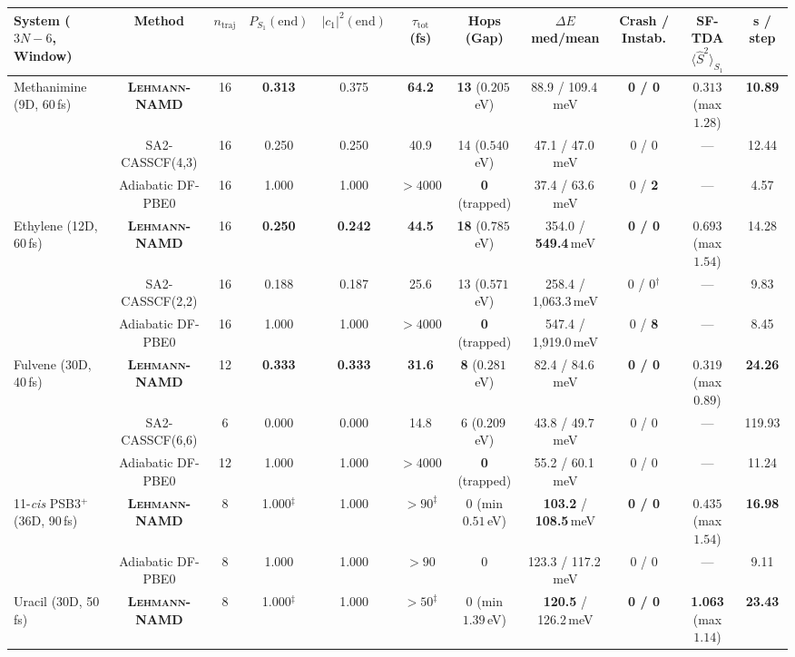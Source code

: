 \documentclass[10pt,twocolumn]{article}
\theoremstyle{natthm}
\newcommand{\leh}{\textsc{Lehmann-NAMD}}
\newcommand{\Ssq}{\langle\hat{S}^2\rangle}
\begin{document}
\begin{table}[t!]
{\begin{tabular}{@{}lcccccccccc@{}}
\midrule
\textbf{System ($3N{-}6$, Window)} & \textbf{Method} & \textbf{$n_{\mathrm{traj}}$} & \textbf{$P_{S_1}(\mathrm{end})$} & \textbf{$|c_1|^2(\mathrm{end})$} & \textbf{$\tau_{\mathrm{tot}}$ (fs)} & \textbf{Hops (Gap)} & \textbf{$\Delta E$ med/mean} & \textbf{Crash / Instab.} & \textbf{SF-TDA $\Ssq_{S_1}$} & \textbf{s / step} \\
\midrule
\multirow{3}{*}{Methanimine (9D, 60\,fs)} & \textbf{\leh{}} & 16 & \textbf{0.313} & 0.375 & \textbf{64.2} & \textbf{13} ($0.205$\,eV) & 88.9 / 109.4\,meV & \textbf{0 / 0} & $0.313$ (max $1.28$) & \textbf{10.89} \\
 & SA2-CASSCF(4,3) & 16 & 0.250 & 0.250 & 40.9 & 14 ($0.540$\,eV) & 47.1 / 47.0\,meV & 0 / 0 & --- & 12.44 \\
 & Adiabatic DF-PBE0 & 16 & 1.000 & 1.000 & $>4000$ & \textbf{0} (trapped) & 37.4 / 63.6\,meV & 0 / \textbf{2} & --- & 4.57 \\
\midrule
\multirow{3}{*}{Ethylene (12D, 60\,fs)} & \textbf{\leh{}} & 16 & \textbf{0.250} & \textbf{0.242} & \textbf{44.5} & \textbf{18} ($0.785$\,eV) & 354.0 / \textbf{549.4}\,meV & \textbf{0 / 0} & $0.693$ (max $1.54$) & 14.28 \\
 & SA2-CASSCF(2,2) & 16 & 0.188 & 0.187 & 25.6 & 13 ($0.571$\,eV) & 258.4 / 1,063.3\,meV & 0 / 0$^\dagger$ & --- & 9.83 \\
 & Adiabatic DF-PBE0 & 16 & 1.000 & 1.000 & $>4000$ & \textbf{0} (trapped) & 547.4 / 1,919.0\,meV & 0 / \textbf{8} & --- & 8.45 \\
\midrule
\multirow{3}{*}{Fulvene (30D, 40\,fs)} & \textbf{\leh{}} & 12 & \textbf{0.333} & \textbf{0.333} & \textbf{31.6} & \textbf{8} ($0.281$\,eV) & 82.4 / 84.6\,meV & \textbf{0 / 0} & $0.319$ (max $0.89$) & \textbf{24.26} \\
 & SA2-CASSCF(6,6) & 6 & 0.000 & 0.000 & 14.8 & 6 ($0.209$\,eV) & 43.8 / 49.7\,meV & 0 / 0 & --- & 119.93 \\
 & Adiabatic DF-PBE0 & 12 & 1.000 & 1.000 & $>4000$ & \textbf{0} (trapped) & 55.2 / 60.1\,meV & 0 / 0 & --- & 11.24 \\
\midrule
\multirow{2}{*}{11-\emph{cis} PSB3$^+$ (36D, 90\,fs)} & \textbf{\leh{}} & 8 & 1.000$^\ddagger$ & 1.000 & $>90^\ddagger$ & 0 (min $0.51$\,eV) & \textbf{103.2} / \textbf{108.5}\,meV & \textbf{0 / 0} & $0.435$ (max $1.54$) & \textbf{16.98} \\
 & Adiabatic DF-PBE0 & 8 & 1.000 & 1.000 & $>90$ & 0 & 123.3 / 117.2\,meV & 0 / 0 & --- & 9.11 \\
\midrule
\multirow{2}{*}{Uracil (30D, 50\,fs)} & \textbf{\leh{}} & 8 & 1.000$^\ddagger$ & 1.000 & $>50^\ddagger$ & 0 (min $1.39$\,eV) & \textbf{120.5} / 126.2\,meV & \textbf{0 / 0} & \textbf{1.063} (max $1.14$) & \textbf{23.43} \\

\end{tabular}}
\end{table}
\end{document}
